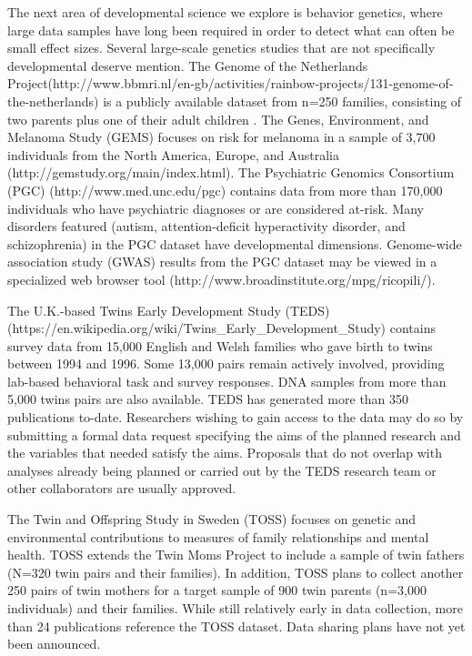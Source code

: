 \documentclass[letterpaper,man,apacite]{apa6}
\begin{document}
The next area of developmental science we explore is behavior genetics, where large data samples have long been required in order to detect what can often be small effect sizes.
Several large-scale genetics studies that are not specifically developmental deserve mention.
The Genome of the Netherlands Project(http://www.bbmri.nl/en-gb/activities/rainbow-projects/131-genome-of-the-netherlands) is a publicly available dataset from n=250 families, consisting of two parents plus one of their adult children \cite{Genome_Netherlands}.
The Genes, Environment, and Melanoma Study (GEMS) focuses on risk for melanoma in a sample of 3,700 individuals from the North America, Europe, and Australia (http://gemstudy.org/main/index.html).
The Psychiatric Genomics Consortium (PGC) (http://www.med.unc.edu/pgc) contains data from more than 170,000 individuals who have psychiatric diagnoses or are considered at-risk.
Many disorders featured (autism, attention-deficit hyperactivity disorder, and schizophrenia) in the PGC dataset have developmental dimensions.
Genome-wide association study (GWAS) results from the PGC dataset may be viewed in a specialized web browser tool (http://www.broadinstitute.org/mpg/ricopili/).

The U.K.-based Twins Early Development Study (TEDS) \cite{TEDS} (https://en.wikipedia.org/wiki/Twins_Early_Development_Study) contains survey data from 15,000 English and Welsh families who gave birth to twins between 1994 and 1996.
Some 13,000 pairs remain actively involved, providing lab-based behavioral task and survey responses.
DNA samples from more than 5,000 twins pairs are also available.
TEDS has generated more than 350 publications to-date.
Researchers wishing to gain access to the data may do so by submitting a formal data request specifying the aims of the planned research and the variables that needed satisfy the aims. 
Proposals that do not overlap with analyses already being planned or carried out by the TEDS research team or other collaborators are usually approved.

The Twin and Offspring Study in Sweden (TOSS) \cite{TOSS} focuses on genetic and environmental contributions to measures of family relationships and mental health.
TOSS extends the Twin Moms Project to include a sample of twin fathers (N=320 twin pairs and their families).
In addition, TOSS plans to collect another 250 pairs of twin mothers for a target sample of 900 twin parents (n=3,000 individuals) and their families.
While still relatively early in data collection, more than 24 publications reference the TOSS dataset.
Data sharing plans have not yet been announced.
\end{document}
